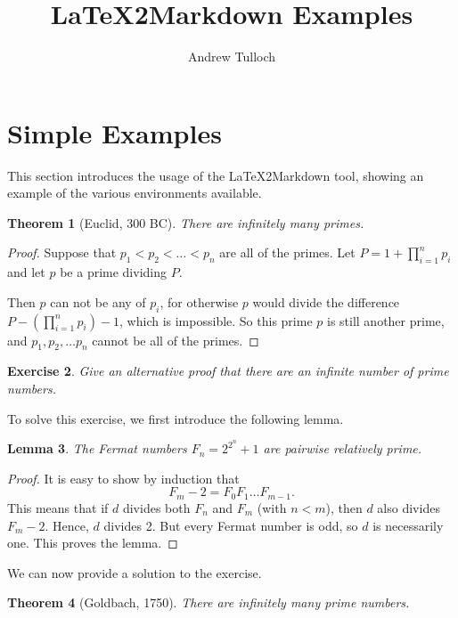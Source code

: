 \documentclass[12pt]{amsart}
\title{LaTeX2Markdown Examples}
\author{Andrew Tulloch}
\theoremstyle{plain}%
\newtheorem{thm}{Theorem}[section]
\newtheorem{lem}[thm]{Lemma}
\newtheorem{exer}[thm]{Exercise}
\begin{document}
\maketitle

\section{Simple Examples}

This section introduces the usage of the LaTeX2Markdown tool, showing an example of the various environments available.  

\begin{thm}[Euclid, 300 BC]
    There are infinitely many primes.
\end{thm}

\begin{proof}
    Suppose that $p_1 < p_2 < \dots < p_n$ are all of the primes. Let $P = 1 + \prod_{i=1}^n p_i$ and let $p$ be a prime dividing $P$.
    
    Then $p$ can not be any of $p_i$, for otherwise $p$ would divide the difference $P - \left(\prod_{i=1}^n p_i \right) - 1$, which is impossible. So this prime $p$ is still another prime, and $p_1, p_2, \dots p_n$ cannot be all of the primes.
\end{proof}

\begin{exer}
    Give an alternative proof that there are an infinite number of prime numbers.
\end{exer}

To solve this exercise, we first introduce the following lemma.
\begin{lem}
    The Fermat numbers $F_n = 2^{2^{n}} + 1$ are pairwise relatively prime.
\end{lem}

\begin{proof}
    It is easy to show by induction that 
    \[ F_m - 2 = F_0 F_1 \dots F_{m-1}. \]
    This means that if $d$ divides both $F_n$ and $F_m$ (with $n < m$), then $d$ also divides $F_m - 2$.  Hence, $d$ divides 2.  But every Fermat number is odd, so $d$ is necessarily one.  This proves the lemma.
\end{proof}

We can now provide a solution to the exercise.

\begin{thm}[Goldbach, 1750]
    There are infinitely many prime numbers.
\end{thm}
\end{document}

